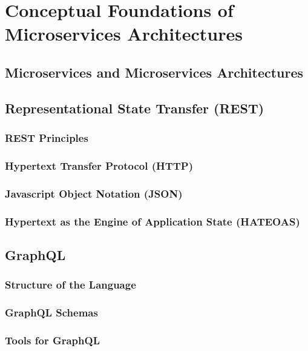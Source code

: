 \section{Conceptual Foundations of Microservices Architectures}\label{sec:foundations}

\subsection{Microservices and Microservices Architectures}

\subsection{Representational State Transfer (\acs{REST})}

\subsubsection{REST Principles}

\subsubsection{Hypertext Transfer Protocol (\acs{HTTP})}

\subsubsection{Javascript Object Notation (\acs{JSON})}

\subsubsection{Hypertext as the Engine of Application State (\acs{HATEOAS})}

\subsection{GraphQL}

\subsubsection{Structure of the Language}

\subsubsection{GraphQL Schemas}

\subsubsection{Tools for GraphQL}